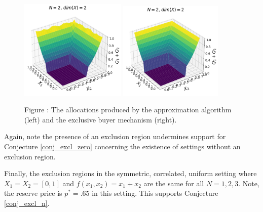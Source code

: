 \documentclass{article}
\newcounter{fig}
\begin{document}
\begin{figure}[H]
    \begin{center}
    \includegraphics[width=0.45\textwidth]{images/symmetric_correlated_unif.png}
    \includegraphics[width=0.44\textwidth]{images/symmetric_correlated_unif_ebm.png}
    \end{center}
    
    \vspace{1mm}
    \raggedright{\small {\sc Figure \thefig\label{fig:symmetric_correlated_alloc}:} The allocations produced by the approximation algorithm (left) and the exclusive buyer mechanism (right).} 
\end{figure}

\noindent Again, note the presence of an exclusion region undermines support for Conjecture \ref{conj_excl_zero} concerning the existence of settings without an exclusion region.

Finally, the exclusion regions in the symmetric, correlated, uniform setting where $X_1 = X_2 = [0,1]$ and $f(x_1,x_2) = x_1 + x_2$ are the same for all $N=1,2,3$. Note, the reserve price is $p^* = .65$ in this setting. This supports Conjecture \ref{conj_excl_n}.

\end{document}
